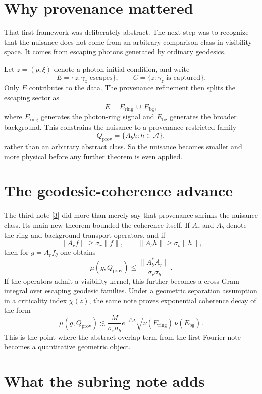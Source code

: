 \documentclass[10pt,letterpaper,twocolumn]{article}
\begin{document}
\section{Why provenance mattered}

That first framework was deliberately abstract. The next step was to recognize that the nuisance does not come from an arbitrary comparison class in visibility space. It comes from escaping photons generated by ordinary geodesics.

Let $z=(p,\xi)$ denote a photon initial condition, and write
\[
E = \{z:\gamma_z \text{ escapes}\},
\qquad
C = \{z:\gamma_z \text{ is captured}\}.
\]
Only $E$ contributes to the data. The provenance refinement then splits the escaping sector as
\[
E = E_{\mathrm{ring}} \,\dot\cup\, E_{\mathrm{bg}},
\]
where $E_{\mathrm{ring}}$ generates the photon-ring signal and $E_{\mathrm{bg}}$ generates the broader background. This constrains the nuisance to a provenance-restricted family
\[
Q_{\mathrm{prov}} = \{A_b h : h\in\mathcal A\},
\]
rather than an arbitrary abstract class. So the nuisance becomes smaller and more physical before any further theorem is even applied.

\section{The geodesic-coherence advance}

The third note [\hyperlink{ref-3}{3}] did more than merely say that provenance shrinks the nuisance class. Its main new theorem bounded the coherence itself. If $A_r$ and $A_b$ denote the ring and background transport operators, and if
\[
\|A_r f\|\ge \sigma_r\|f\|,
\qquad
\|A_b h\|\ge \sigma_b\|h\|,
\]
then for $g=A_r f_\theta$ one obtains
\[
\mu(g,Q_{\mathrm{prov}})
\le
\frac{\|A_b^*A_r\|}{\sigma_r\sigma_b}.
\]
If the operators admit a visibility kernel, this further becomes a cross-Gram integral over escaping geodesic families. Under a geometric separation assumption in a criticality index $\chi(z)$, the same note proves exponential coherence decay of the form
\[
\mu(g,Q_{\mathrm{prov}})
\lesssim
\frac{M}{\sigma_r\sigma_b}e^{-\beta\Delta}
\sqrt{\nu(E_{\mathrm{ring}})\,\nu(E_{\mathrm{bg}})}.
\]
This is the point where the abstract overlap term from the first Fourier note becomes a quantitative geometric object.

\section{What the subring note adds}
\end{document}
